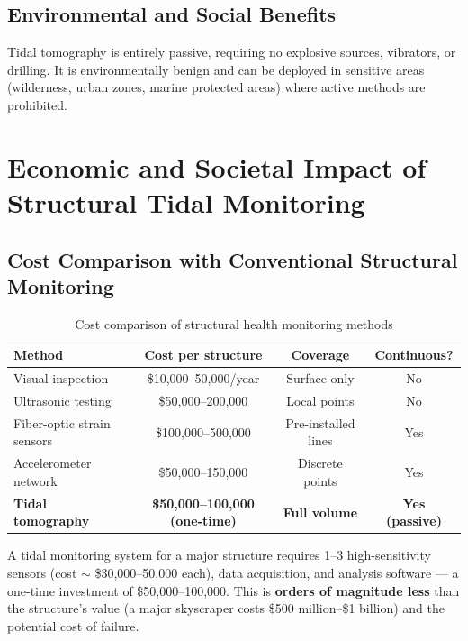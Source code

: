 \documentclass[12pt,a4paper]{article}
\theoremstyle{remark}
\begin{document}
	\subsection{Environmental and Social Benefits}
	
	Tidal tomography is entirely passive, requiring no explosive sources, vibrators, or drilling. It is environmentally benign and can be deployed in sensitive areas (wilderness, urban zones, marine protected areas) where active methods are prohibited.
	
	\section{Economic and Societal Impact of Structural Tidal Monitoring}
	\label{sec:structural-economics}
	
	\subsection{Cost Comparison with Conventional Structural Monitoring}
	
	\begin{table}[htbp]
		\centering
		\caption{Cost comparison of structural health monitoring methods}
		\label{tab:structural-costs}
		\small
		\begin{tabular}{lccc}
			\toprule
			\textbf{Method} & \textbf{Cost per structure} & \textbf{Coverage} & \textbf{Continuous?} \\
			\midrule
			Visual inspection & \$10,000–50,000/year & Surface only & No \\
			Ultrasonic testing & \$50,000–200,000 & Local points & No \\
			Fiber-optic strain sensors & \$100,000–500,000 & Pre-installed lines & Yes \\
			Accelerometer network & \$50,000–150,000 & Discrete points & Yes \\
			\textbf{Tidal tomography} & \textbf{\$50,000–100,000 (one-time)} & \textbf{Full volume} & \textbf{Yes (passive)} \\
			\bottomrule
		\end{tabular}
	\end{table}
	
	A tidal monitoring system for a major structure requires 1–3 high-sensitivity sensors (cost \(\sim\) \$30,000–50,000 each), data acquisition, and analysis software — a one-time investment of \$50,000–100,000. This is \textbf{orders of magnitude less} than the structure's value (a major skyscraper costs \$500 million–\$1 billion) and the potential cost of failure.
	
\end{document}
